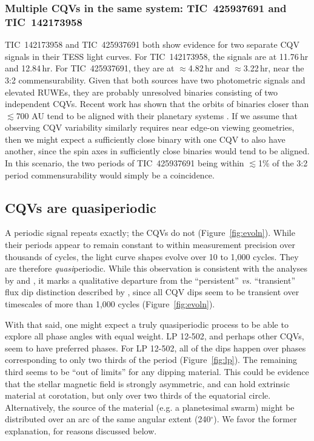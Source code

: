\documentclass[11pt,twocolumn,tighten]{aastex63}
\begin{document}
\subsubsection{Multiple CQVs in the same system: TIC~425937691 and TIC~142173958}

TIC~142173958 and TIC~425937691 both show evidence for two separate
CQV signals in their TESS light curves.  For TIC~142173958, the
signals are at 11.76\,hr and 12.84\,hr.  For TIC~425937691, they are
at $\approx$4.82\,hr and $\approx$3.22\,hr, near the 3:2
commensurability.  Given that both sources have two photometric
signals and elevated RUWEs, they are probably unresolved binaries
consisting of two independent CQVs.  Recent work has shown that the
orbits of binaries closer than $\lesssim$700 AU tend to be aligned
with their planetary systems \citep[e.g.][]{2022AJ....163..207C}.  If
we assume that observing CQV variability similarly requires near
edge-on viewing geometries, then we might expect a sufficiently close
binary with one CQV to also have another, since the spin axes in
sufficiently close binaries would tend to be aligned.  In this
scenario, the two periods of TIC~425937691 being within $\lesssim$1\%
of the 3:2 period commensurability would simply be a coincidence.


\subsection{CQVs are quasiperiodic}

A periodic signal repeats exactly; the CQVs do not
(Figure~\ref{fig:evoln}).  While their periods appear to remain
constant to within measurement precision over thousands of cycles, the
light curve shapes evolve over 10 to 1{,}000 cycles.  They are
therefore {\it quasi}periodic.  While this observation is consistent
with the analyses by \citet{2022AJ....163..144G} and
\citet{2023ApJ...945..114P}, it marks a qualitative departure from the
``persistent'' {\it vs.} ``transient'' flux dip distinction described
by \citet{2017AJ....153..152S}, since all CQV dips seem to be
transient over timescales of more than 1{,}000 cycles
(Figure~\ref{fig:evoln}).

With that said, one might expect a truly quasiperiodic process to be
able to explore all phase angles with equal weight.  LP 12-502, and
perhaps other CQVs, seem to have preferred phases.  For LP 12-502, all
of the dips happen over phases corresponding to only two thirds of the
period (Figure~\ref{fig:lp}).  The remaining third seems to be ``out
of limits'' for any dipping material.  This could be evidence that the
stellar magnetic field is strongly asymmetric, and can hold extrinsic
material at corotation, but only over two thirds of the equatorial
circle.  Alternatively, the source of the material (e.g. a
planetesimal swarm) might be distributed over an arc of the same
angular extent (240$^\circ$).  We favor the former explanation, for
reasons discussed below.
\end{document}
